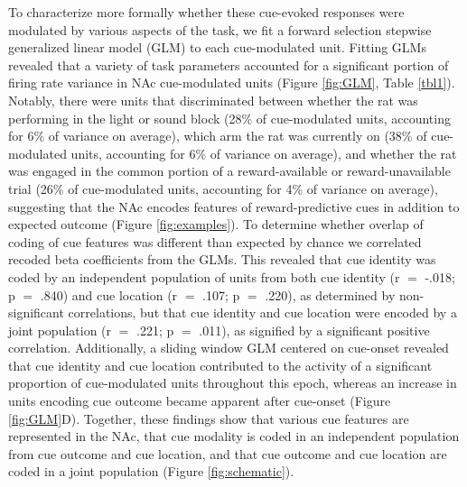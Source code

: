 \documentclass[11pt]{article}
\begin{document}
To characterize more formally whether these cue-evoked responses were modulated by various aspects of the task, we fit a forward selection stepwise generalized linear model (GLM) to each cue-modulated unit. Fitting GLMs revealed that a variety of task parameters accounted for a significant portion of firing rate variance in NAc cue-modulated units (Figure \ref{fig:GLM}, Table \ref{tbl1}). Notably, there were units that discriminated between whether the rat was performing in the light or sound block (28\% of cue-modulated units, accounting for 6\% of variance on average), which arm the rat was currently on (38\% of cue-modulated units, accounting for 6\% of variance on average), and whether the rat was engaged in the common portion of a reward-available or reward-unavailable trial (26\% of cue-modulated units, accounting for 4\% of variance on average), suggesting that the NAc encodes features of reward-predictive cues in addition to expected outcome (Figure \ref{fig:examples}). To determine whether overlap of coding of cue features was different than expected by chance we correlated recoded beta coefficients from the GLMs. This revealed that cue identity was coded by an independent population of units from both cue identity (r $=$ -.018; p $=$ .840) and cue location (r $=$ .107; p $=$ .220), as determined by non-significant correlations, but that cue identity and cue location were encoded by a joint population (r $=$ .221; p $=$ .011), as signified by a significant positive correlation. Additionally, a sliding window GLM centered on cue-onset revealed that cue identity and cue location contributed to the activity of a significant proportion of cue-modulated units throughout this epoch, whereas an increase in units encoding cue outcome became apparent after cue-onset (Figure \ref{fig:GLM}D). Together, these findings show that various cue features are represented in the NAc, that cue modality is coded in an independent population from cue outcome and cue location, and that cue outcome and cue location are coded in a joint population (Figure \ref{fig:schematic}).
\end{document}
